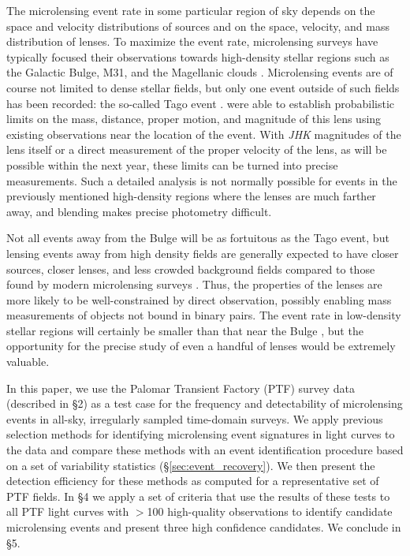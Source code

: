 \documentclass[12pt,preprint]{aastex}
\begin{document}
The microlensing event rate in some particular region of sky depends on the space and velocity distributions of sources and on the space, velocity, and mass distribution of lenses. To maximize the event rate, microlensing surveys have typically focused their observations towards high-density stellar regions such as the Galactic Bulge, M31, and the Magellanic clouds \citep[e.g.][]{original_ogle, original_macho, eros_original, crotts1996}. Microlensing events are of course not limited to dense stellar fields, but only one event outside of such fields has been recorded: the so-called Tago event \citep{fukui2007, gaudi2008}. \cite{gaudi2008} were able to establish probabilistic limits on the mass, distance, proper motion, and magnitude of this lens using existing observations near the location of the event. With \textit{JHK} magnitudes of the lens itself or a direct measurement of the proper velocity of the lens, as will be possible within the next year, these limits can be turned into precise measurements. Such a detailed analysis is not normally possible for events in the previously mentioned high-density regions where the lenses are much farther away, and blending makes precise photometry difficult. 

Not all events away from the Bulge will be as fortuitous as the Tago event, but lensing events away from high density fields are generally expected to have closer sources, closer lenses, and less crowded background fields compared to those found by modern microlensing surveys \citep{mesolensing}. Thus, the properties of the lenses are more likely to be well-constrained by direct observation, possibly enabling mass measurements of objects not bound in binary pairs. The event rate in low-density stellar regions will certainly be smaller than that near the Bulge \citep[e.g.,][]{wood_optical_depth, ogle_optical_depth, macho_optical_depth, eros_optical_depth}, but the opportunity for the precise study of even a handful of lenses would be extremely valuable. 

In this paper, we use the Palomar Transient Factory (PTF) survey data (described in \S2) as a test case for the frequency and detectability of microlensing events in all-sky, irregularly sampled time-domain surveys. We apply previous selection methods for identifying microlensing event signatures in light curves to the data and compare these methods with an event identification procedure based on a set of variability statistics (\S\ref{sec:event_recovery}). We then present the detection efficiency for these methods as computed for a representative set of PTF fields. In \S4 we apply a set of criteria that use the results of these tests to all PTF light curves with $>$100 high-quality observations to identify candidate microlensing events and present three high confidence candidates. We conclude in \S5.
\end{document}
